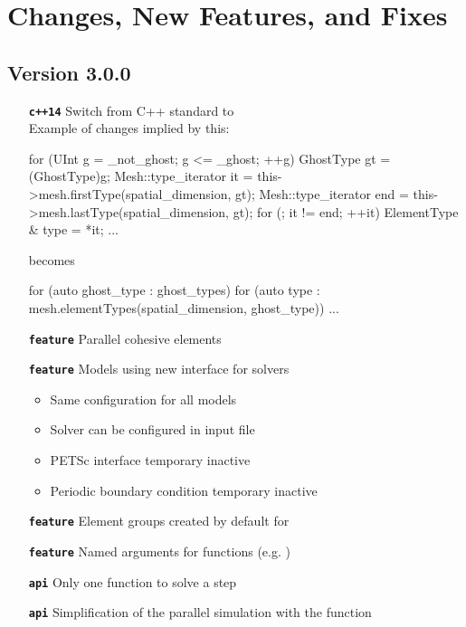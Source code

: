\chapter*{Changes, New Features, and Fixes}

\section*{Version 3.0.0}

\begin{itemize}
\item[\textbf{\texttt{c++14}}] Switch from C++ standard  to \\
  Example of changes implied by this:
  \begin{cpp}
 for (UInt g = _not_ghost; g <= _ghost; ++g) {
   GhostType gt = (GhostType)g;
   Mesh::type_iterator it = this->mesh.firstType(spatial_dimension, gt);
   Mesh::type_iterator end = this->mesh.lastType(spatial_dimension, gt);
   for (; it != end; ++it) {
     ElementType & type = *it;
       ...
   }
 }
\end{cpp}
becomes
  \begin{cpp}
 for (auto ghost_type : ghost_types) {
   for (auto type : mesh.elementTypes(spatial_dimension,
                                      ghost_type)) {
     ...
   }
 }
\end{cpp}
\item[\textbf{\texttt{feature}}] Parallel cohesive elements
\item[\textbf{\texttt{feature}}] Models using new interface for solvers
  \begin{itemize}
  \item Same configuration for all models
  \item Solver can be configured in input file
  \item PETSc interface temporary inactive
  \item Periodic boundary condition temporary inactive
  \end{itemize}
\item[\textbf{\texttt{feature}}] Element groups created by default for 
\item[\textbf{\texttt{feature}}] Named arguments for functions (e.g. )

\item[\textbf{\texttt{api}}] Only one function to solve a step 
\item[\textbf{\texttt{api}}] Simplification of the parallel simulation with the
   function

\end{itemize}

